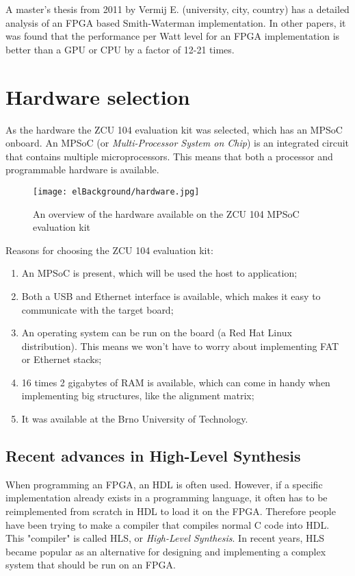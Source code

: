 A master's thesis from 2011 by Vermij E. (university, city, country) %
 has a detailed analysis of an FPGA based Smith-Waterman implementation. In other papers, it was found that the performance per Watt level for an FPGA implementation is better than a GPU or CPU by a factor of 12-21 times.

\section{Hardware selection}

As the hardware the ZCU 104 evaluation kit was selected, which has an MPSoC onboard. An MPSoC (or \emph{Multi-Processor System on Chip}) is an integrated circuit that contains multiple microprocessors. This means that both a processor and programmable hardware is available.

\begin{figure}[H]
	\centering
	\texttt{[image: elBackground/hardware.jpg]}
	\caption{An overview of the hardware available on the ZCU 104 MPSoC evaluation kit}
	\label{fig:hardware}
\end{figure}

Reasons for choosing the ZCU 104 evaluation kit:
\begin{enumerate}
	\item An MPSoC is present, which will be used the host to application;
	\item Both a USB and Ethernet interface is available, which makes it easy to communicate with the target board;
	\item An operating system can be run on the board (a Red Hat Linux distribution). This means we won't have to worry about implementing FAT or Ethernet stacks;
	\item 16 times 2 gigabytes of RAM is available, which can come in handy when implementing big structures, like the alignment matrix;
	\item It was available at the Brno University of Technology.
\end{enumerate}

\subsection{Recent advances in High-Level Synthesis}

When programming an FPGA, an HDL is often used. However, if a specific implementation already exists in a programming language, it often has to be reimplemented from scratch in HDL to load it on the FPGA. Therefore people have been trying to make a compiler that compiles normal C code into HDL. This "compiler" is called HLS, or \emph{ High-Level Synthesis}. In recent years, HLS became popular as an alternative for designing and implementing a complex system that should be run on an FPGA.

